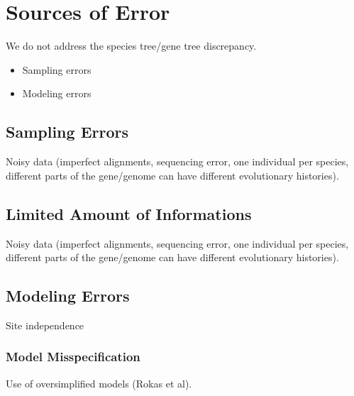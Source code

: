 \section{Sources of Error} \label{sec:error-sources}

We do not address the species tree/gene tree discrepancy. 

\begin{itemize}
 \item Sampling errors
 \item Modeling errors
\end{itemize}

\subsection{Sampling Errors} \label{sec:sampling-error}
Noisy data (imperfect alignments, sequencing error, one individual per species, different parts of the gene/genome can have different evolutionary histories). 

\subsection{Limited Amount of Informations} \label{sec:small-n}
Noisy data (imperfect alignments, sequencing error, one individual per species, different parts of the gene/genome can have different evolutionary histories). 

\subsection{Modeling Errors} \label{sec:modeling-errors}
Site independence

\subsubsection{Model Misspecification} \label{sec:misspecification}
Use of oversimplified models (Rokas et al). 




